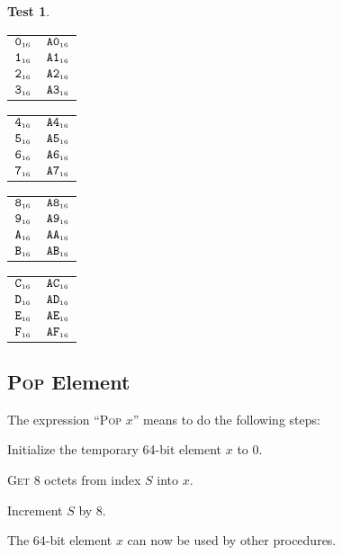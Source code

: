 \documentclass[a4paper,12pt]{article}
\makeatletter
\newcommand{\num}[1]{\texttt{#1}}
\newcommand{\hex}[1]{\num{#1}_{\textup{\tiny 16}}}
\newcommand{\MEM}[1]{\ifthenelse{\equal{#1}{}}{M}{M[#1]}}
\newcommand{\SP}{S}
\newcommand{\proc}[1]{\textsc{#1}}
\theoremstyle{definition}
\newtheorem{test}{Test}
\newenvironment{memtable}{%
  \begin{trivlist}
    \item
    }{%
    \end{trivlist}}
\newenvironment{memcolumn}{%
  \begin{tabular}{@{}ll@{}}
    \hline}
    {%
    \hline
  \end{tabular}}
\newcommand{\memspace}{\qquad}
\makeatother
\begin{document}
\begin{test}
  \begin{memtable}
    \begin{memcolumn}
      $\hex{0}$ & $\hex{A0}$ \\
      $\hex{1}$ & $\hex{A1}$ \\
      $\hex{2}$ & $\hex{A2}$ \\
      $\hex{3}$ & $\hex{A3}$ \\
    \end{memcolumn}
    \memspace
    \begin{memcolumn}
      $\hex{4}$ & $\hex{A4}$ \\
      $\hex{5}$ & $\hex{A5}$ \\
      $\hex{6}$ & $\hex{A6}$ \\
      $\hex{7}$ & $\hex{A7}$ \\
    \end{memcolumn}
    \memspace
    \begin{memcolumn}
      $\hex{8}$ & $\hex{A8}$ \\
      $\hex{9}$ & $\hex{A9}$ \\
      $\hex{A}$ & $\hex{AA}$ \\
      $\hex{B}$ & $\hex{AB}$ \\
    \end{memcolumn}
    \memspace
    \begin{memcolumn}
      $\hex{C}$ & $\hex{AC}$ \\
      $\hex{D}$ & $\hex{AD}$ \\
      $\hex{E}$ & $\hex{AE}$ \\
      $\hex{F}$ & $\hex{AF}$ \\
    \end{memcolumn}
  \end{memtable}
\end{test}

\subsection{\proc{Pop} Element}

The expression ``\proc{Pop} $x$'' means to do the following steps:
\begin{stepnumbers}
\item Initialize the temporary 64-bit element $x$ to 0.
\item \proc{Get} 8 octets from index $\SP$ into $x$.
\item Increment $\SP$ by 8.
\end{stepnumbers}
The 64-bit element $x$ can now be used by other procedures.
\end{document}
